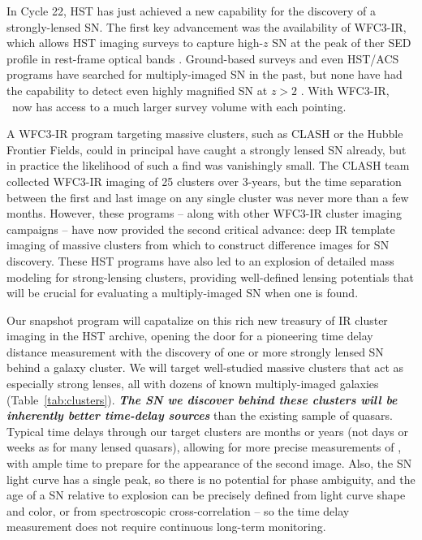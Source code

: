 \medskip
{}
 
In Cycle 22, HST has just achieved a new capability for the discovery
of a strongly-lensed SN. The first key advancement was the
availability of WFC3-IR, which allows HST imaging surveys to capture
high-$z$ SN at the peak of ther SED profile in rest-frame optical
bands \citep{Rodney:2012,Jones:2013}.  Ground-based surveys and even
HST/ACS programs have searched for multiply-imaged SN in the past, but
none have had the capability to detect even highly magnified SN at
$z>2$ \citep[e.g.][]{Dawson:2009,Sand:2011}.  With WFC3-IR, \Hubble\
now has access to a much larger survey volume with each pointing.

A WFC3-IR program targeting massive clusters, such as CLASH or the
Hubble Frontier Fields, could in principal have caught a strongly
lensed SN already, but in practice the likelihood of such a find was
vanishingly small.  The CLASH team collected WFC3-IR imaging of 25
clusters over 3-years, but the time separation between the first and
last image on any single cluster was never more than a few months.
However, these programs -- along with other WFC3-IR cluster imaging
campaigns -- have now provided the second critical advance: deep IR
template imaging of massive clusters from which to construct
difference images for SN discovery.  These HST programs have also led
to an explosion of detailed mass modeling for strong-lensing clusters,
providing well-defined lensing potentials that will be crucial for
evaluating a multiply-imaged SN when one is found.  

Our snapshot program will capatalize on this rich new treasury of IR
cluster imaging in the HST archive, opening the door for a pioneering
time delay distance measurement with the discovery of one or more
strongly lensed SN behind a galaxy cluster.  We will target
well-studied massive clusters that act as especially strong lenses,
all with dozens of known multiply-imaged galaxies
(Table~\ref{tab:clusters}).  {\bf \em The SN we discover behind these
clusters will be inherently better time-delay sources} than the
existing sample of quasars.  Typical time delays through our target
clusters are months or years (not days or weeks as for many lensed
quasars), allowing for more precise measurements of \dt, with ample
time to prepare for the appearance of the second image.  Also, the SN
light curve has a single peak, so there is no potential for phase
ambiguity, and the age of a SN relative to explosion can be precisely
defined from light curve shape and color, or from spectroscopic
cross-correlation \citep{Filippenko:1997,Blondin:2007} -- so the time
delay measurement does not require continuous long-term monitoring.


